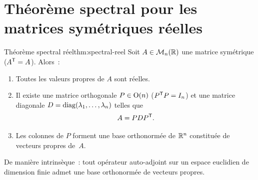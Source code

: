 \section{Théorème spectral pour les matrices symétriques réelles}%
\label{sec:spectral-reel}

\begin{theorem}{Théorème spectral réel}{thm:spectral-reel}
  Soit $A \in \mathcal{M}_n({\mathbb{R}})$ une matrice symétrique
  (${A}^{\mathsf{T}} = A$). Alors~:
  \begin{enumerate}[label=(\roman*)]
    \item Toutes les valeurs propres de $A$ sont réelles.
    \item Il existe une matrice orthogonale
      $P \in \operatorname{O}(n)$ (${P}^{\mathsf{T}}P = I_n$) et une matrice diagonale
      $D = \operatorname{diag}(\lambda_1, \ldots, \lambda_n)$ telles que
      \[
        A = P D {P}^{\mathsf{T}}.
      \]
    \item Les colonnes de $P$ forment une base orthonormée de ${\mathbb{R}}^n$
      constituée de vecteurs propres de~$A$.
  \end{enumerate}
  De manière intrinsèque~: tout opérateur auto-adjoint sur un espace
  euclidien de dimension finie admet une base orthonormée de vecteurs
  propres.
\end{theorem}

